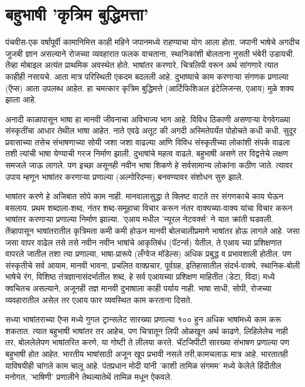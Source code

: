 \chapter{बहुभाषी 'कृत्रिम बुद्धिमत्ता'}

पंचवीस-एक वर्षांपूर्वी कामानिमित्त काही महिने जपानमध्ये राहण्याचा योग आला होता. जपानी भाषेचे अगदीच जुजबी ज्ञान असल्याने रोजच्या व्यवहारात फलक वाचताना, स्थानिकांशी बोलताना नुसती भंबेरी उडायची. तेंव्हा मोबाइल अत्यंत प्राथमिक अवस्थेत होते. भाषांतर करणारे, चित्रलिपी वरून अर्थ सांगणारे त्यात काहीही नसायचे. आता मात्र परिस्थिती एकदम बदलली आहे. दुभाष्याचे काम करणाऱ्या संगणक प्रणाल्या (ऍप्स) आता उपलब्ध आहेत. हा चमत्कार कृत्रिम बुद्धिमत्ते (आर्टिफिशिअल इंटेलिजन्स, एआय) मुळे शक्य झाला आहे.

अनादी काळापासून भाषा हा मानवी जीवनाचा अविभाज्य भाग आहे. विविध ठिकाणी असणाऱ्या वेगवेगळ्या संस्कृतींचा आधार तेथील भाषा आहेत. नाते एवढे अतूट की अगदी अस्मितेपर्यंत पोहोचते कधी कधी. सुदूर प्रवासाच्या तसेच संभाषणाच्या सोयी जशा जशा वाढल्या आणि विविध संस्कृतीच्या लोकांशी संपर्क वाढला तशी त्यांची भाषा येण्याची गरज निर्माण झाली. दुभाषांचे महत्व वाढले. बहुभाषी असणे तर विद्वत्तेचे लक्षण समजले जाऊ लागले. पण इच्छा असूनही नवीन भाषा शिकणे हे सर्वसामान्य लोकांना कठीण जाते. त्यावर उपाय म्हणून भाषांतर करणाऱ्या प्रणाल्या (अल्गोरिदम्स) बनवण्यावर संशोधन सुरु झाले.

भाषांतर करणे हे अजिबात सोपे काम नाही. मानवालासुद्धा ते क्लिष्ट वाटते तर संगणकाचे काय घेऊन बसलाय. प्रथम शब्दाला-शब्द, नंतर शब्द-समूहाचा विचार करून नंतर वाक्यच्या-वाक्य यांचा विचार करून भाषांतर करणाऱ्या प्रणाल्या निर्माण झाल्या. 'एआय मधील 'न्यूरल नेटवर्क्स' ने यात क्रांती घडवली. तेंव्हापासून भाषांतरातील कृत्रिमता कमी कमी होऊन मानवी बोलचालीप्रमाणे भाषांतर होऊ लागले आहे. जसा जसा वापर वाढेल तसे तसे नवीन नवीन भाषांचे आकृतिबंध (पॅटर्न्स) येतील, ते एआय च्या प्रशिक्षणात वापरले जातील तशा त्या प्रणाल्या, भाषा-प्रारूपे (लँग्वेज मॉडेल्स) अधिक प्रबुद्ध व प्रभावशाली होतील. पण संस्कृतीचे सर्व आयाम, मानवी भावना, प्रचलित वाक्प्रचार, पूर्वग्रह, इतिहासातील संदर्भ-वाक्ये, स्थानिक-बोली भाषेचे रंग, विशिष्ठ तंत्रज्ञानासंदर्भातील शब्द, हे सर्व एआयच्या प्रशिक्षण माहितीत (डेटा, विदा) मध्ये क्वचितच असल्याने, अजूनही तज्ञ मानवी दुभाषाला काही पर्याय नाही. भाषा साधी, सोपी, रोजच्या व्यवहारातील असेल तर एआय फार व्यवस्थित काम करताना दिसते.

सध्या भाषांतराच्या ऍप्स मध्ये गुगल ट्रान्सलेट सारख्या प्रणाल्या १०० हुन अधिक भाषांमध्ये काम करू शकतात. त्यात बहुभाषी भाषांतर तर आहेच, पण चित्रातून लिपी ओळखून अर्थ काढणे, लिहिलेलेच नाही तर, बोललेलेपण भाषांतरित करणे, या गोष्टी ते लीलया करते. चॅटजिपीटी सारख्या संभाषण प्रणाल्या पण बहुभाषी होत आहेत. भारतीय भाषांसाठी अजून खूप प्रभावी नसले तरी,कामचलाऊ मात्र आहे. भारतातही याविषयीही चांगले काम चालू आहे. पंतप्रधान मोदी यांनी 'काशी तामिळ संगमम' मध्ये केलेले हिंदीतील मनोगत, 'भाषिणी' प्रणालीने तेथल्यातेथें तामिळ मधून ऐकवले.

